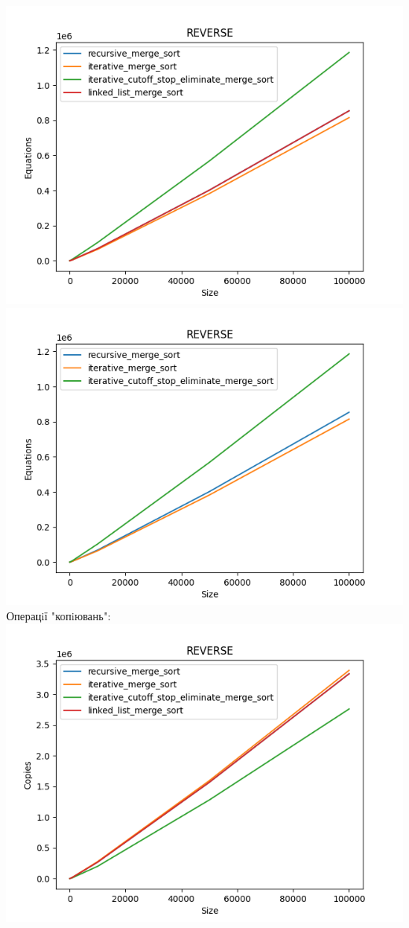 \documentclass{article}
\begin{document}
        \includegraphics[scale=0.5]{reverse_Equations_4_sorts_6_numbers_50_100to100000.png}
        \includegraphics[scale=0.5]{reverse_Equations_3_sorts_6_numbers_50_100to100000.png}
    \newpage
    Операцiї "копiювань":
    \newline
        \includegraphics[scale=0.5]{reverse_Copies_4_sorts_6_numbers_50_100to100000.png}
\end{document}
